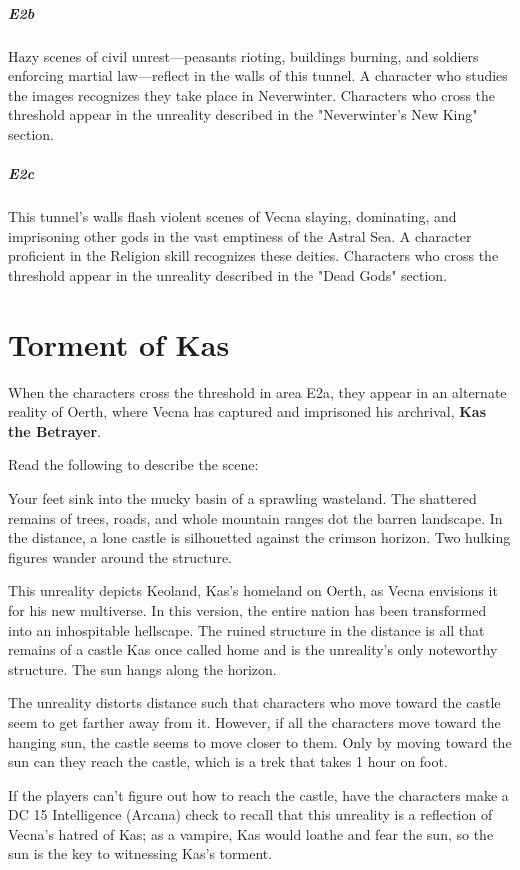 \documentclass[10pt,a4paper,twoside,bg=print,twocolumn,openany,nodeprecatedcode]{dndbook}
\begin{document}
\subparagraph{E2b}
Hazy scenes of civil unrest—peasants rioting, buildings burning, and soldiers enforcing martial law—reflect in the walls of this tunnel. A character who studies the images recognizes they take place in Neverwinter. Characters who cross the threshold appear in the unreality described in the "Neverwinter's New King" section.

\subparagraph{E2c}
This tunnel's walls flash violent scenes of Vecna slaying, dominating, and imprisoning other gods in the vast emptiness of the Astral Sea. A character proficient in the Religion skill recognizes these deities. Characters who cross the threshold appear in the unreality described in the "Dead Gods" section.

\section{Torment of Kas}
When the characters cross the threshold in area E2a, they appear in an alternate reality of Oerth, where Vecna has captured and imprisoned his archrival, \textbf{Kas the Betrayer}.

Read the following to describe the scene:

\begin{DndReadAloud}{}
Your feet sink into the mucky basin of a sprawling wasteland. The shattered remains of trees, roads, and whole mountain ranges dot the barren landscape. In the distance, a lone castle is silhouetted against the crimson horizon. Two hulking figures wander around the structure.

\end{DndReadAloud}

This unreality depicts Keoland, Kas's homeland on Oerth, as Vecna envisions it for his new multiverse. In this version, the entire nation has been transformed into an inhospitable hellscape. The ruined structure in the distance is all that remains of a castle Kas once called home and is the unreality's only noteworthy structure. The sun hangs along the horizon.

The unreality distorts distance such that characters who move toward the castle seem to get farther away from it. However, if all the characters move toward the hanging sun, the castle seems to move closer to them. Only by moving toward the sun can they reach the castle, which is a trek that takes 1 hour on foot.

If the players can't figure out how to reach the castle, have the characters make a DC 15 Intelligence (Arcana) check to recall that this unreality is a reflection of Vecna's hatred of Kas; as a vampire, Kas would loathe and fear the sun, so the sun is the key to witnessing Kas's torment.
\end{document}
